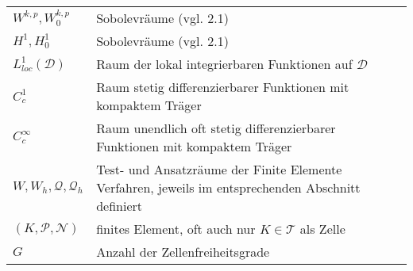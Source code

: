 \begin{longtable}[c]{ p{} p{}}
	$ W^{k,p},W_0^{k,p} $ & Sobolevräume (vgl. 2.1) \\
	$ H^1,H_0^1$ & Sobolevräume (vgl. 2.1) \\
	$ L^1_{loc}(\mathcal{ D}) $ & Raum der lokal integrierbaren Funktionen auf $ \mathcal{ D} $ \\
	$ C_c^{1} $ & Raum stetig differenzierbarer Funktionen mit kompaktem  Träger \\
	$ C_c^{\infty} $ & Raum unendlich oft stetig differenzierbarer Funktionen mit kompaktem  Träger \\
	$ W,W_h,\mathcal{Q},\mathcal{Q}_h $ & Test- und Ansatzräume der Finite Elemente Verfahren, jeweils im entsprechenden Abschnitt definiert\\
	$ (K,\mathcal{P},\mathcal{N}) $ & finites Element, oft auch nur $ K \in \mathcal{T}$ als Zelle \\
	$ G $ & Anzahl der Zellenfreiheitsgrade \\
	\hline
\end{longtable}


